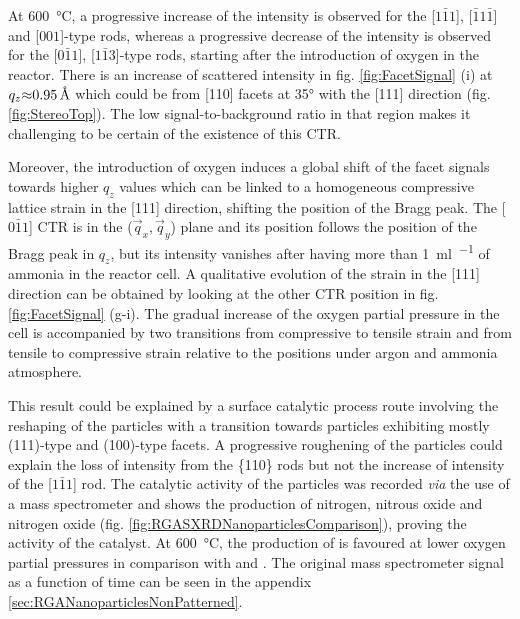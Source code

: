 At \qty{600}{\degreeCelsius}, a progressive increase of the intensity is observed for the [$1\bar{1}1$], [$\bar{1}1\bar{1}$] and [$001$]-type rods, whereas a progressive decrease of the intensity is observed for the [$0\bar{1}1$], [$1\bar{1}3$]-type rods, starting after the introduction of oxygen in the reactor.
There is an increase of scattered intensity in fig. \ref{fig:FacetSignal} (i) at $q_z \qty{\approx 0.95}{\angstrom}$ which could be from [110] facets at \ang{35} with the [111] direction (fig. \ref{fig:StereoTop}).
The low signal-to-background ratio in that region makes it challenging to be certain of the existence of this CTR.

Moreover, the introduction of oxygen induces a global shift of the facet signals towards higher $q_z$ values which can be linked to a homogeneous compressive lattice strain in the [111] direction, shifting the position of the Bragg peak.
The [$0\bar{1}1$] CTR is in the ($\vec{q}_x, \vec{q}_y$) plane and its position follows the position of the Bragg peak in $q_z$, but its intensity vanishes after having more than \qty{1}{\ml\per\min} of ammonia in the reactor cell.
A qualitative evolution of the strain in the [111] direction can be obtained by looking at the other CTR position in fig. \ref{fig:FacetSignal} (g-i).
The gradual increase of the oxygen partial pressure in the cell is accompanied by two transitions from compressive to tensile strain and from tensile to compressive strain relative to the positions under argon and ammonia atmosphere.

This result could be explained by a surface catalytic process route involving the reshaping of the particles with a transition towards particles exhibiting mostly (111)-type and (100)-type facets.
A progressive roughening of the particles could explain the loss of intensity from the \{110\} rods but not the increase of intensity of the [$1\bar{1}1$] rod.
The catalytic activity of the particles was recorded \textit{via} the use of a mass spectrometer and shows the production of nitrogen, nitrous oxide and nitrogen oxide (fig. \ref{fig:RGASXRDNanoparticlesComparison}), proving the activity of the catalyst.
At \qty{600}{\degreeCelsius}, the production of \nitrogen is favoured at lower oxygen partial pressures in comparison with \nitrogendioxide and \nitricoxide.
The original mass spectrometer signal as a function of time can be seen in the appendix \ref{sec:RGANanoparticlesNonPatterned}.

